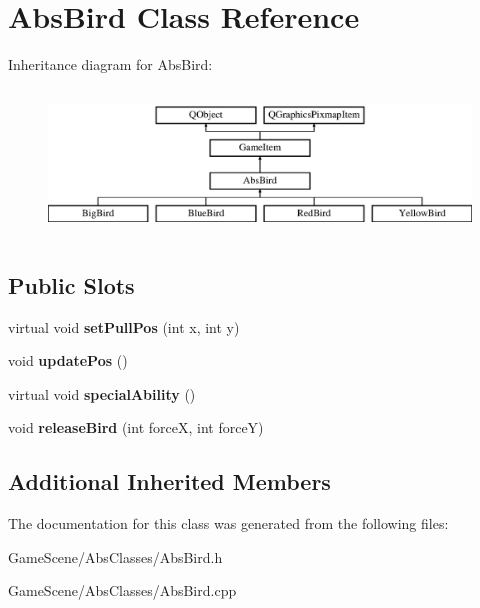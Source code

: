 \hypertarget{classAbsBird}{}\section{Abs\+Bird Class Reference}
\label{classAbsBird}
Inheritance diagram for Abs\+Bird\+:\begin{figure}[H]
\begin{center}
\leavevmode
\includegraphics[height=3.916084cm]{classAbsBird}
\end{center}
\end{figure}
\subsection*{Public Slots}
\begin{DoxyCompactItemize}
\item 
virtual void {\bfseries set\+Pull\+Pos} (int x, int y)\hypertarget{classAbsBird_a82b0185bc20c859c92321ff849d27020}{}\label{classAbsBird_a82b0185bc20c859c92321ff849d27020}

\item 
void {\bfseries update\+Pos} ()\hypertarget{classAbsBird_a360c1ee1844ceee60625dad148bf3d49}{}\label{classAbsBird_a360c1ee1844ceee60625dad148bf3d49}

\item 
virtual void {\bfseries special\+Ability} ()\hypertarget{classAbsBird_a83c7cf1a8deda52d57f3b79662b9a03e}{}\label{classAbsBird_a83c7cf1a8deda52d57f3b79662b9a03e}

\item 
void {\bfseries release\+Bird} (int forceX, int forceY)\hypertarget{classAbsBird_a6908dc186b792cc4b376f362dab34e92}{}\label{classAbsBird_a6908dc186b792cc4b376f362dab34e92}

\end{DoxyCompactItemize}
\subsection*{Additional Inherited Members}


The documentation for this class was generated from the following files\+:\begin{DoxyCompactItemize}
\item 
Game\+Scene/\+Abs\+Classes/Abs\+Bird.\+h\item 
Game\+Scene/\+Abs\+Classes/Abs\+Bird.\+cpp\end{DoxyCompactItemize}

